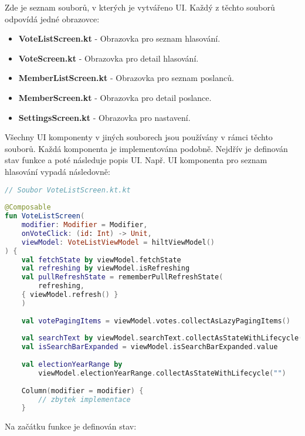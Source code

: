 \noindent Zde je seznam souborů, v kterých je vytvářeno UI. Každý z těchto souborů odpovídá jedné obrazovce:

\begin{itemize}
	\item \textbf{VoteListScreen.kt} - Obrazovka pro seznam hlasování.
	\item \textbf{VoteScreen.kt} - Obrazovka pro detail hlasování.
	\item \textbf{MemberListScreen.kt} - Obrazovka pro seznam poslanců.
	\item \textbf{MemberScreen.kt} - Obrazovka pro detail poslance.
	\item \textbf{SettingsScreen.kt} - Obrazovka pro nastavení.
\end{itemize}

\noindent Všechny UI komponenty v jiných souborech jsou používány v rámci těchto souborů. Každá komponenta je implementována podobně. Nejdřív je definován stav funkce a poté následuje popis UI. Např. UI komponenta pro seznam hlasování vypadá následovně:

\begin{lstlisting}[caption={Komponenta pro seznam hlasování}, tabsize=2, language=Kotlin]
// Soubor VoteListScreen.kt.kt
	
@Composable
fun VoteListScreen(
	modifier: Modifier = Modifier,
	onVoteClick: (id: Int) -> Unit,
	viewModel: VoteListViewModel = hiltViewModel()
) {
	val fetchState by viewModel.fetchState
	val refreshing by viewModel.isRefreshing
	val pullRefreshState = rememberPullRefreshState(
		refreshing,
	{ viewModel.refresh() }
	)
	
	val votePagingItems = viewModel.votes.collectAsLazyPagingItems()
	
	val searchText by viewModel.searchText.collectAsStateWithLifecycle()
	val isSearchBarExpanded = viewModel.isSearchBarExpanded.value
	
	val electionYearRange by 
		viewModel.electionYearRange.collectAsStateWithLifecycle("")
	
	Column(modifier = modifier) {
		// zbytek implementace
	}
\end{lstlisting}

\noindent Na začátku funkce je definován stav:

